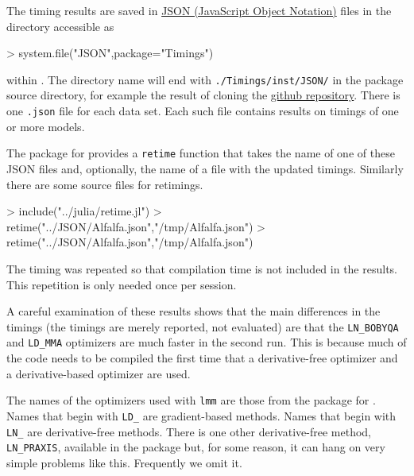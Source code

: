 \documentclass[article]{jss}
\begin{document}
The timing results are saved in \href{http://json.org}{JSON (JavaScript
Object Notation)} files in the directory accessible as

\begin{Schunk}
\begin{Sinput}
> system.file("JSON",package="Timings")
\end{Sinput}
\end{Schunk}

within . The directory name will end with
\texttt{./Timings/inst/JSON/} in the package source directory, for
example the result of cloning the
\href{https://github.com/Stat990-033/Timings}{github repository}. There
is one \texttt{.json} file for each data set. Each such file contains
results on timings of one or more models.

The  package for  provides a \texttt{retime}
function that takes the name of one of these JSON files and, optionally,
the name of a file with the updated timings. Similarly there are some
source files for  retimings.

\begin{Schunk}
\begin{Sinput}
> include("../julia/retime.jl")
> retime("../JSON/Alfalfa.json","/tmp/Alfalfa.json")
> retime("../JSON/Alfalfa.json","/tmp/Alfalfa.json")
\end{Sinput}
\end{Schunk}


  The timing was repeated so that compilation time is not included in the
results. This repetition is only needed once per session.

A careful examination of these results shows that the main differences
in the  timings (the  timings are merely reported, not evaluated)
are that the \texttt{LN\_BOBYQA} and \texttt{LD\_MMA} optimizers are
much faster in the second run. This is because much of the code needs to
be compiled the first time that a derivative-free optimizer and a
derivative-based optimizer are used.

The names of the optimizers used with \texttt{lmm} are those from the
 package for . Names that begin with \texttt{LD\_} are gradient-based
methods. Names that begin with \texttt{LN\_} are derivative-free
methods. There is one other derivative-free method, \texttt{LN\_PRAXIS},
available in the  package but, for some reason, it can
hang on very simple problems like this. Frequently we omit it.
\end{document}
